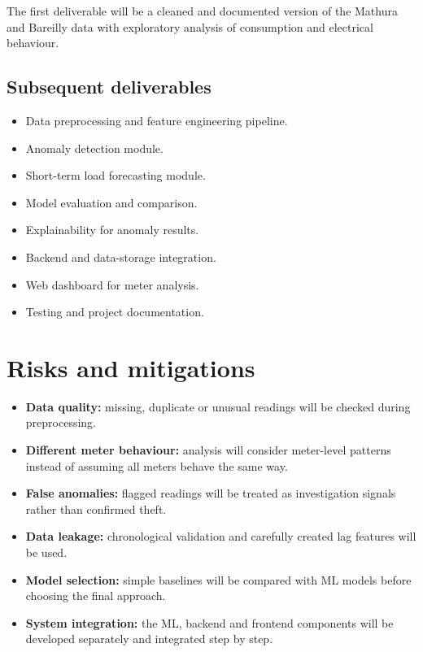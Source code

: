 \documentclass[11pt,a4paper]{article}
\begin{document}
The first deliverable will be a cleaned and documented version of
the Mathura and Bareilly data with exploratory analysis of
consumption and electrical behaviour.

\subsection{Subsequent deliverables}

\begin{itemize}[leftmargin=0.7cm]

    \item Data preprocessing and feature engineering pipeline.

    \item Anomaly detection module.

    \item Short-term load forecasting module.

    \item Model evaluation and comparison.

    \item Explainability for anomaly results.

    \item Backend and data-storage integration.

    \item Web dashboard for meter analysis.

    \item Testing and project documentation.

\end{itemize}

\section{Risks and mitigations}

\begin{itemize}[leftmargin=0.7cm]

    \item \textbf{Data quality:} missing, duplicate or unusual
    readings will be checked during preprocessing.

    \item \textbf{Different meter behaviour:} analysis will consider
    meter-level patterns instead of assuming all meters behave the
    same way.

    \item \textbf{False anomalies:} flagged readings will be treated
    as investigation signals rather than confirmed theft.

    \item \textbf{Data leakage:} chronological validation and
    carefully created lag features will be used.

    \item \textbf{Model selection:} simple baselines will be compared
    with ML models before choosing the final approach.

    \item \textbf{System integration:} the ML, backend and frontend
    components will be developed separately and integrated step by
    step.

\end{itemize}
\end{document}
